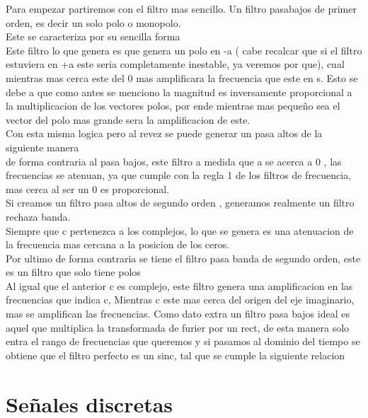 Para empezar partiremos con el filtro mas sencillo. Un filtro pasabajos de primer orden, es decir un solo polo o monopolo.\\
Este se caracteriza por su sencilla forma
\\ Este filtro lo que genera es que genera un polo en -a ( cabe recalcar que si el filtro estuviera en +a este seria completamente inestable, ya veremos por que), cual mientras mas cerca este del 0 mas amplificara la frecuencia que este en s. Esto se debe a que como antes se menciono la magnitud es inversamente proporcional a la multiplicacion de los vectores polos, por ende mientras mas pequeño sea el vector del polo mas grande sera la amplificacion de este.\\
Con esta misma logica pero al revez se puede generar un pasa altos de la siguiente manera
\\ de forma contraria al pasa bajos, este filtro a medida que a se acerca a 0 , las frecuencias se atenuan, ya que cumple con la regla 1 de los filtros de frecuencia, mas cerca al ser un 0 es proporcional.\\
Si creamos un filtro pasa altos de segundo orden , generamos realmente un filtro rechaza banda.
\\
Siempre que c pertenezca a los complejos, lo que se genera es una atenuacion de la frecuencia mas cercana a la posicion de los ceros.\\
Por ultimo de forma contraria se tiene el filtro pasa banda de segundo orden, este es un filtro que solo tiene polos
\\ Al igual que el anterior c es complejo, este filtro genera una amplificacion en las frecuencias que indica c, Mientras c este mas cerca del origen del eje imaginario, mas se amplifican las frecuencias.
Como dato extra un filtro pasa bajos ideal es aquel que multiplica la transformada de furier por un rect, de esta manera solo entra el rango de frecuencias que queremos y si pasamos al dominio del tiempo se obtiene que el filtro perfecto es un sinc, tal que se cumple la siguiente relacion

\newpage
\section{Señales discretas}
